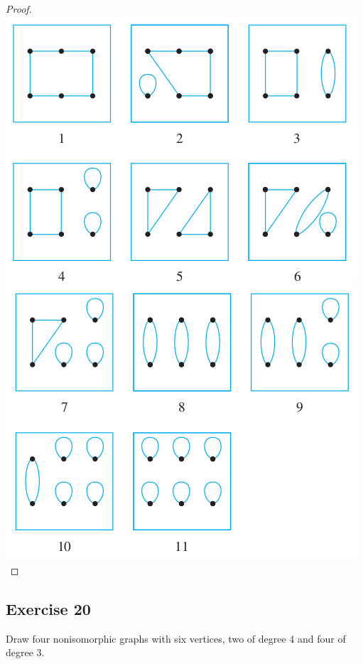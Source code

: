 \documentclass[14pt]{extarticle}
\begin{document}
\begin{proof}
    \includegraphics[scale=0.4]{../images/10.3.19.a.png}
    \includegraphics[scale=0.4]{../images/10.3.19.b.png}
\end{proof}

\subsection{Exercise 20}
Draw four nonisomorphic graphs with six vertices, two of degree 4 and four of degree 3.
\end{document}
